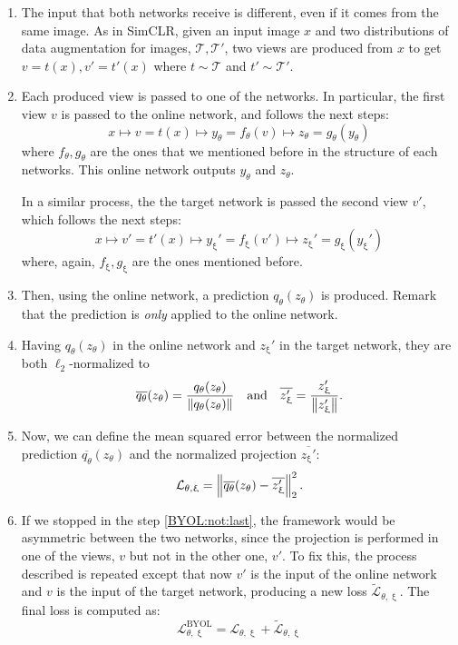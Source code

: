\begin{enumerate}
\item The input that both networks receive is different, even if it comes from the same image. As in SimCLR, given an input image $x$ and two distributions of data augmentation for images, $\mathcal T, \mathcal T'$, two views are produced from $x$ to get $v = t(x), v' = t'(x)$ where $t \sim \mathcal T $ and $t' \sim \mathcal T'$.

\item Each produced view is passed to one of the networks. In particular, the first view $v$ is passed to the online network, and follows the next steps:
\[
x \longmapsto v = t(x) \longmapsto y_\theta = f_\theta(v) \longmapsto z_\theta =  g_\theta(y_\theta)    
\]
where $f_\theta,g_\theta$ are the ones that we mentioned before in the structure of each networks. This online network outputs $y_\theta$ and $z_\theta$.

In a similar process, the the target network is passed the second view $v'$, which follows the next steps:
\[
x \longmapsto v' = t'(x) \longmapsto y_\upxi' = f_\upxi(v') \longmapsto z_\upxi' = g_\upxi(y_\upxi')   
\]
where, again, $f_\upxi,g_\upxi$ are the ones mentioned before.


\item Then, using the online network, a prediction $q_\theta(z_\theta)$ is produced. Remark that the prediction is \emph{only} applied to the online network.

\item Having $q_\theta(z_\theta)$ in the online network and $z_\upxi'$ in the target network, they are both $\ell_2$-normalized to
\[
\overline{q_\theta}(z_\theta) = \frac{q_\theta(z_\theta)}{\left\lVert q_\theta(z_\theta)\right\rVert} \quad \text{and} \quad \overline{z_\upxi'} = \frac{z_\upxi'}{\left\lVert z_\upxi'\right\rVert}. 
\]

\item \label{BYOL:not:last} Now, we can define the mean squared error between the normalized prediction $\overline{q_\theta}(z_\theta)$ and the normalized projection $\overline{z_\upxi'}$:
\[
\mathcal L_{\theta,\upxi} = \left\lVert\overline{q_\theta}(z_\theta) - \overline{z_\upxi'}\right\rVert_2^2. 
\]

\item If we stopped in the step \ref{BYOL:not:last}, the framework would be asymmetric between the two networks, since the projection is performed in one of the views, $v$ but not in the other one, $v'$. To fix this, the process described is repeated except that now $v'$ is the input of the online network and $v$ is the input of the target network, producing a new loss $\tilde{\mathcal L}_{\theta,\upxi}$. The final loss is computed as:
\begin{equation}\label{Loss:BYOL}
\mathcal L_{\theta,\upxi}^{\operatorname{BYOL}}     = \mathcal L_{\theta,\upxi} + \tilde{\mathcal L}_{\theta,\upxi} 
\end{equation}
\end{enumerate}

